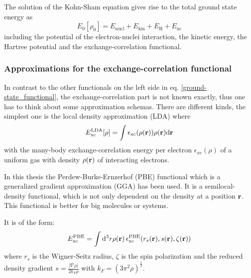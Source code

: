 	
	The solution of the Kohn-Sham equation gives rise to the total ground state energy as 
	\begin{equation} \label{ground-state_functional}
		E_0 [\rho_0] = E_{\text{nucl}} + E_{\text{kin}} + E_\text{H} + E_{\text{xc}} 
	\end{equation}
	including the potential of the electron-nuclei interaction, the kinetic energy, the Hartree potential and the exchange-correlation functional.
	
	\subsubsection{Approximations for the exchange-correlation functional} \label{xc-func}
		In contrast to the other functionals on the left side in eq. \eqref{ground-state_functional}, the exchange-correlation part is not known exactly, thus one has to think about some approximation schemas.
		There are different kinds, the simplest one is the local density approximation (LDA) where 
		\begin{equation}
		E_{\text{xc}}^{\text{LDA}}[\rho] = \int \epsilon_{\text{xc}} (\rho(\textbf{r})) \rho(\textbf{r}) \mathrm{d} \textbf{r}
		\end{equation} 
		with the many-body exchange-correlation energy per electron $\epsilon_{xc}(\rho)$ of a uniform gas with density $\rho(\textbf{r})$ of interacting electrons.
		
		In this thesis the Perdew-Burke-Ernzerhof (PBE) functional which is a generalized gradient approximation (GGA) has been used. It is a semilocal-density functional, which is not only dependent on the density at a position $\textbf{r}$. This functional is better for big molecules or systems.
		
		It is of the form:
		\begin{equation}
			E_{\text{xc}}^{\text{PBE}} = \int \mathrm{d}^3 r \rho(\textbf{r}) 
			\,\epsilon_{\text{xc}}^{\text{PBE}} (r_s (\textbf{r}), s(\textbf{r}), \zeta(\textbf{r}))
		\end{equation}
		where $r_s$ is the Wigner-Seitz radius, $\zeta$ is the spin polarization and the reduced density gradient $s=\frac{|\nabla \rho|}{2 k_F \rho}$ with $k_F = (3 \pi^2 \rho)^{\frac{1}{3}}$. 
